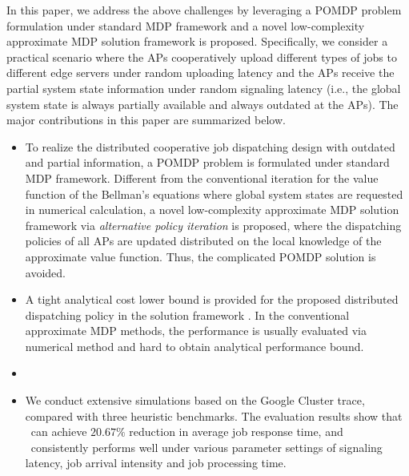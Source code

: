 In this paper, we address the above challenges by leveraging a POMDP problem formulation under standard MDP framework and a novel low-complexity approximate MDP solution framework is proposed.
Specifically, we consider a practical scenario where the APs cooperatively upload different types of jobs to different edge servers under random uploading latency and the APs receive the partial system state information under random signaling latency (i.e., the global system state is always partially available and always outdated at the APs).
The major contributions in this paper are summarized below.
\begin{itemize}
    \item To realize the distributed cooperative job dispatching design with outdated and partial information, a POMDP problem is formulated under standard MDP framework.
    Different from the conventional iteration for the value function of the Bellman's equations where global system states are requested in numerical calculation, a novel low-complexity approximate MDP solution framework via \emph{alternative policy iteration} is proposed, where the dispatching policies of all APs are updated distributed on the local knowledge of the approximate value function.
    Thus, the complicated POMDP solution is avoided.
    \item A tight analytical cost lower bound is provided for the proposed distributed dispatching policy in the solution framework \algname. In the conventional approximate MDP methods, the performance is usually evaluated via numerical method and hard to obtain analytical performance bound.
    \item {}
    \item We conduct extensive simulations based on the Google Cluster trace, compared with three heuristic benchmarks. The evaluation results show that \algname~can achieve $20.67\%$ reduction in average job response time, and \algname~consistently performs well under various parameter settings of signaling latency, job arrival intensity and job processing time. 
\end{itemize}

